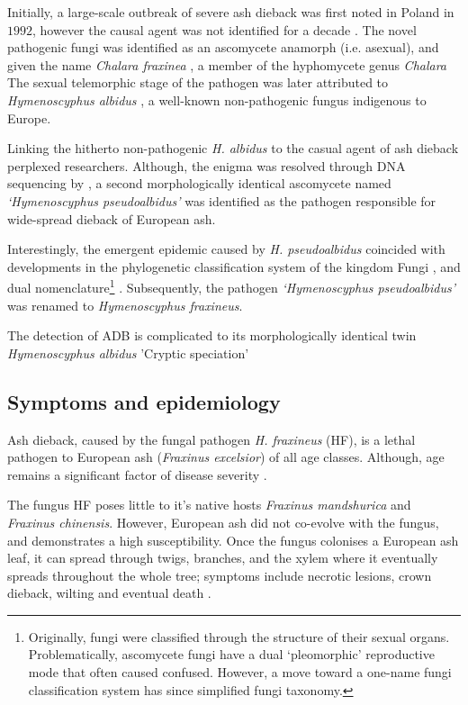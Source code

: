 Initially, a large-scale outbreak of severe ash dieback was first noted in Poland in $1992$, however the causal agent was not identified for a decade \cite{kowalski2001zamieraniu}.
The novel pathogenic fungi was identified as an ascomycete anamorph (i.e. asexual), and given the name \textit{Chalara fraxinea} \cite{kowalski2006chalara}, a member of the hyphomycete genus \textit{Chalara}
The sexual telemorphic stage of the pathogen was later attributed to \textit{Hymenoscyphus albidus} \cite{kowalski2009teleomorph}, a well-known non-pathogenic fungus indigenous to Europe.

Linking the hitherto non-pathogenic \textit{H. albidus} to the casual agent of ash dieback perplexed researchers. 
Although, the enigma was resolved through DNA sequencing by \cite{queloz2011cryptic}, a second morphologically identical ascomycete named \textit{`Hymenoscyphus pseudoalbidus'} was identified as the pathogen responsible for wide-spread dieback of European ash. 

Interestingly, the emergent epidemic caused by \textit{H. pseudoalbidus} coincided with developments in the phylogenetic classification system of the kingdom Fungi \cite{hibbett2007higher}, and dual nomenclature\footnote{Originally, fungi were classified through the structure of their sexual organs. Problematically, ascomycete fungi have a dual `pleomorphic' reproductive mode that often caused confused. However, a move toward a one-name fungi classification system has since simplified fungi taxonomy.} \cite{wingfield2012one}. Subsequently, the pathogen \textit{`Hymenoscyphus pseudoalbidus'} was renamed to \textit{Hymenoscyphus fraxineus}.

The detection of ADB is complicated to its morphologically identical twin \textit{Hymenoscyphus albidus} \cite{queloz2011cryptic} 'Cryptic speciation'

\subsection{Symptoms and epidemiology}

Ash dieback, caused by the fungal pathogen \textit{H. fraxineus} (HF), is a lethal pathogen to European ash (\textit{Fraxinus excelsior}) of all age classes. 
Although, age remains a significant factor of disease severity \cite{marccais2017estimation}.
 
The fungus HF poses little to it's native hosts \textit{Fraxinus mandshurica} and \textit{Fraxinus chinensis}.
However, European ash did not co-evolve with the fungus, and demonstrates a high susceptibility.
Once the fungus colonises a European ash leaf, it can spread through twigs, branches, and the xylem where it eventually spreads throughout the whole tree;
symptoms include necrotic lesions, crown dieback, wilting and eventual death \cite{gross2014h}.

